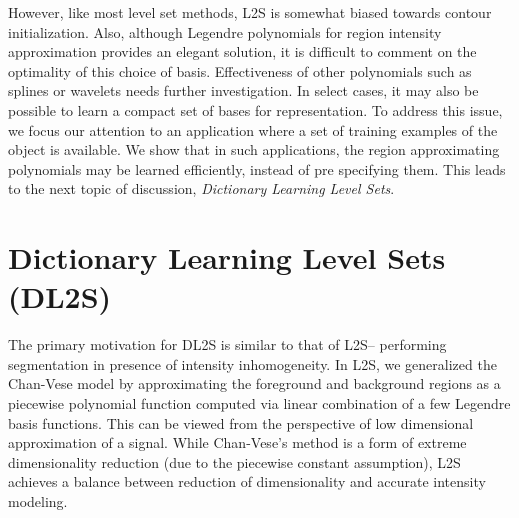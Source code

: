 However, like most level set methods, L2S is somewhat biased towards contour initialization. 
Also, although Legendre polynomials for region intensity approximation provides an elegant solution, it is difficult to comment on the optimality of this choice of basis. Effectiveness of other polynomials such as splines or wavelets \cite{achuthan2010wavelet} needs further investigation. In select cases, it may also be possible to learn a compact set of bases for representation. To address this issue, we focus our attention to an application where a set of training examples of the object is available. We show that in such applications, the region approximating polynomials may be learned efficiently, instead of pre specifying them. This leads to the next topic of discussion, \textit{Dictionary Learning Level Sets}.

\section{Dictionary Learning Level Sets (DL2S)}

The primary motivation for DL2S is similar to that of L2S-- performing segmentation in presence of intensity inhomogeneity. In L2S\cite{mukherjee_L2S}, we generalized the Chan-Vese model by approximating the foreground and background regions as a piecewise polynomial function  computed via linear combination of a few Legendre basis functions. This can be viewed from the perspective of low dimensional approximation of a signal.  While Chan-Vese's method is a form of extreme dimensionality reduction (due to the piecewise constant assumption), L2S achieves a balance between reduction of dimensionality and accurate intensity modeling. 

